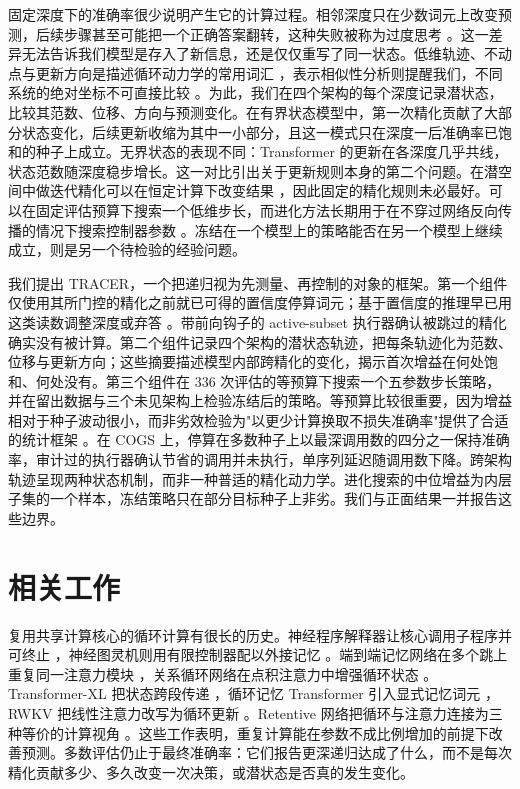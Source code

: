\documentclass[12pt,a4paper]{article}
\begin{document}
固定深度下的准确率很少说明产生它的计算过程。相邻深度只在少数词元上改变预测，后续步骤甚至可能把一个正确答案翻转，这种失败被称为过度思考 \citep{kaya2019shallowdeep}。这一差异无法告诉我们模型是存入了新信息，还是仅仅重写了同一状态。低维轨迹、不动点与更新方向是描述循环动力学的常用词汇 \citep{sussillo2013blackbox,vyas2020population,haviv2019memory}，表示相似性分析则提醒我们，不同系统的绝对坐标不可直接比较 \citep{kriegeskorte2008rsa,kornblith2019cka}。为此，我们在四个架构的每个深度记录潜状态，比较其范数、位移、方向与预测变化。在有界状态模型中，第一次精化贡献了大部分状态变化，后续更新收缩为其中一小部分，且这一模式只在深度一后准确率已饱和的种子上成立。无界状态的表现不同：Transformer 的更新在各深度几乎共线，状态范数随深度稳步增长。这一对比引出关于更新规则本身的第二个问题。在潜空间中做迭代精化可以在恒定计算下改变结果 \citep{lee2020iterative,geng2021rewrite}，因此固定的精化规则未必最好。可以在固定评估预算下搜索一个低维步长，而进化方法长期用于在不穿过网络反向传播的情况下搜索控制器参数 \citep{stanley2002neat,such2017neuro}。冻结在一个模型上的策略能否在另一个模型上继续成立，则是另一个待检验的经验问题。

我们提出 TRACER，一个把递归视为先测量、再控制的对象的框架。第一个组件仅使用其所门控的精化之前就已可得的置信度停算词元；基于置信度的推理早已用这类读数调整深度或弃答 \citep{liu2020fastbert,xin2020deebert,geifman2017selective}。带前向钩子的 active-subset 执行器确认被跳过的精化确实没有被计算。第二个组件记录四个架构的潜状态轨迹，把每条轨迹化为范数、位移与更新方向；这些摘要描述模型内部跨精化的变化，揭示首次增益在何处饱和、何处没有。第三个组件在 336 次评估的等预算下搜索一个五参数步长策略，并在留出数据与三个未见架构上检验冻结后的策略。等预算比较很重要，因为增益相对于种子波动很小，而非劣效检验为"以更少计算换取不损失准确率"提供了合适的统计框架 \citep{docampobayon2025noninferiority,gu2023evaluation}。在 COGS 上，停算在多数种子上以最深调用数的四分之一保持准确率，审计过的执行器确认节省的调用并未执行，单序列延迟随调用数下降。跨架构轨迹呈现两种状态机制，而非一种普适的精化动力学。进化搜索的中位增益为内层子集的一个样本，冻结策略只在部分目标种子上非劣。我们与正面结果一并报告这些边界。



\section{相关工作}
\label{sec:related}

复用共享计算核心的循环计算有很长的历史。神经程序解释器让核心调用子程序并可终止 \citep{reed2016programmer}，神经图灵机则用有限控制器配以外接记忆 \citep{graves2014neural}。端到端记忆网络在多个跳上重复同一注意力模块 \citep{sukhbaatar2015memory}，关系循环网络在点积注意力中增强循环状态 \citep{santoro2018relational}。Transformer-XL 把状态跨段传递 \citep{dai2019transformerxl}，循环记忆 Transformer 引入显式记忆词元 \citep{bulatov2022recurrent}，RWKV 把线性注意力改写为循环更新 \citep{peng2023rwkv}。Retentive 网络把循环与注意力连接为三种等价的计算视角 \citep{sun2023retentive}。这些工作表明，重复计算能在参数不成比例增加的前提下改善预测。多数评估仍止于最终准确率：它们报告更深递归达成了什么，而不是每次精化贡献多少、多久改变一次决策，或潜状态是否真的发生变化。
\end{document}
